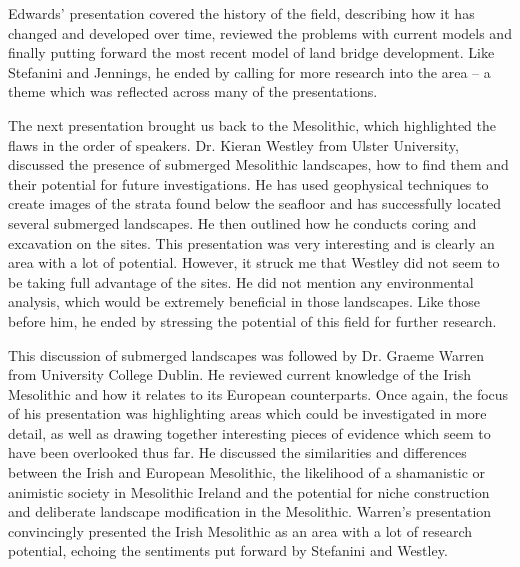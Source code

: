 \documentclass[%
	]{ijsra}
\begin{document}
Edwards’ presentation covered the history of the field, describing how it has changed and developed over time, reviewed the problems with current models and finally putting forward the most recent model of land bridge development. Like Stefanini and Jennings, he ended by calling for more research into the area – a theme which was reflected across many of the presentations. 

The next presentation brought us back to the Mesolithic, which highlighted the flaws in the order of speakers. Dr. Kieran Westley from Ulster University, discussed the presence of submerged Mesolithic landscapes, how to find them and their potential for future investigations. He has used geophysical techniques to create images of the strata found below the seafloor and has successfully located several submerged landscapes. He then outlined how he conducts coring and excavation on the sites. This presentation was very interesting and is clearly an area with a lot of potential. However, it struck me that Westley did not seem to be taking full advantage of the sites. He did not mention any environmental analysis, which would be extremely beneficial in those landscapes. Like those before him, he ended by stressing the potential of this field for further research. 

This discussion of submerged landscapes was followed by Dr. Graeme Warren from University College Dublin. He reviewed current knowledge of the Irish Mesolithic and how it relates to its European counterparts. Once again, the focus of his presentation was highlighting areas which could be investigated in more detail, as well as drawing together interesting pieces of evidence which seem to have been overlooked thus far. He discussed the similarities and differences between the Irish and European Mesolithic, the likelihood of a shamanistic or animistic society in Mesolithic Ireland and the potential for niche construction and deliberate landscape modification in the Mesolithic. Warren’s presentation convincingly presented the Irish Mesolithic as an area with a lot of research potential, echoing the sentiments put forward by Stefanini and Westley.
\end{document}
